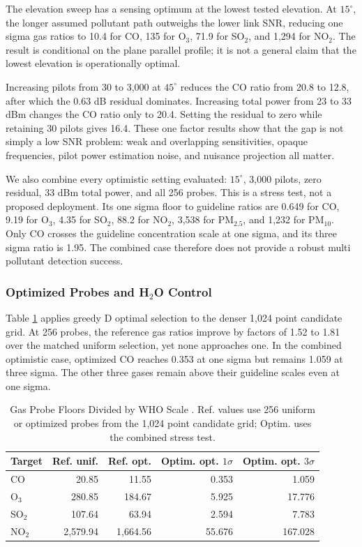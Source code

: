 \documentclass[conference]{IEEEtran}
\newcommand{\pmfive}{PM$_{2.5}$}
\newcommand{\pmten}{PM$_{10}$}
\begin{document}
The elevation sweep has a sensing optimum at the lowest tested elevation. At $15^\circ$, the longer assumed pollutant path outweighs the lower link SNR, reducing one sigma gas ratios to 10.4 for CO, 135 for O$_3$, 71.9 for SO$_2$, and 1,294 for NO$_2$. The result is conditional on the plane parallel profile; it is not a general claim that the lowest elevation is operationally optimal.

Increasing pilots from 30 to 3,000 at $45^\circ$ reduces the CO ratio from 20.8 to 12.8, after which the 0.63 dB residual dominates. Increasing total power from 23 to 33 dBm changes the CO ratio only to 20.4. Setting the residual to zero while retaining 30 pilots gives 16.4. These one factor results show that the gap is not simply a low SNR problem: weak and overlapping sensitivities, opaque frequencies, pilot power estimation noise, and nuisance projection all matter.

We also combine every optimistic setting evaluated: $15^\circ$, 3,000 pilots, zero residual, 33 dBm total power, and all 256 probes. This is a stress test, not a proposed deployment. Its one sigma floor to guideline ratios are 0.649 for CO, 9.19 for O$_3$, 4.35 for SO$_2$, 88.2 for NO$_2$, 3,538 for \pmfive, and 1,232 for \pmten. Only CO crosses the guideline concentration scale at one sigma, and its three sigma ratio is 1.95. The combined case therefore does not provide a robust multi pollutant detection success.

\subsubsection{Optimized Probes and H$_2$O Control}

Table \ref{tab:optimized} applies greedy D optimal selection to the denser 1,024 point candidate grid. At 256 probes, the reference gas ratios improve by factors of 1.52 to 1.81 over the matched uniform selection, yet none approaches one. In the combined optimistic case, optimized CO reaches 0.353 at one sigma but remains 1.059 at three sigma. The other three gases remain above their guideline scales even at one sigma.

\begin{table}[t]
\caption{Gas Probe Floors Divided by WHO Scale \cite{who2021aqg}. Ref. values use 256 uniform or optimized probes from the 1,024 point candidate grid; Optim. uses the combined stress test.}
\label{tab:optimized}
\centering
\scriptsize
\setlength{\tabcolsep}{2.4pt}
\begin{tabular}{@{}lrrrr@{}}
\toprule
Target & Ref. unif. & Ref. opt. & Optim. opt. $1\sigma$ & Optim. opt. $3\sigma$ \\
\midrule
CO & 20.85 & 11.55 & 0.353 & 1.059 \\
O$_3$ & 280.85 & 184.67 & 5.925 & 17.776 \\
SO$_2$ & 107.64 & 63.94 & 2.594 & 7.783 \\
NO$_2$ & 2,579.94 & 1,664.56 & 55.676 & 167.028 \\
\bottomrule
\end{tabular}
\end{table}
\end{document}
